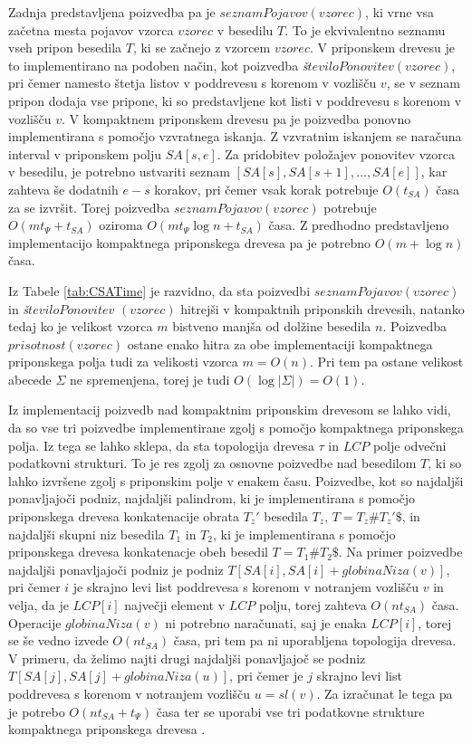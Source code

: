 Zadnja predstavljena poizvedba pa je $seznamPojavov(vzorec)$, ki vrne vsa začetna mesta pojavov vzorca $vzorec$  v besedilu $T$. To je ekvivalentno seznamu vseh pripon besedila $T$, ki se začnejo z vzorcem $vzorec$. V priponskem drevesu je to implementirano na podoben način, kot poizvedba \textit{š}$teviloPonovitev(vzorec)$, pri čemer namesto štetja listov v poddrevesu s korenom v vozlišču $v$, se v seznam pripon dodaja vse pripone, ki so predstavljene kot listi v poddrevesu s korenom v vozlišču $v$. V kompaktnem priponskem drevesu pa je poizvedba ponovno implementirana s pomočjo vzvratnega iskanja. Z vzvratnim iskanjem se naračuna interval v priponskem polju $SA[s,e]$. Za pridobitev položajev ponovitev vzorca v besedilu, je potrebno ustvariti seznam $[SA[s],SA[s+1],\dots,SA[e]]$, kar zahteva še dodatnih $e-s$ korakov, pri čemer vsak korak potrebuje $O(t_{SA})$ časa za se izvršit. Torej poizvedba $seznamPojavov(vzorec)$ potrebuje $O(mt_\Psi+t_{SA})$ oziroma $O(mt_\Psi \log{n}+t_{SA})$ časa. Z predhodno predstavljeno implementacijo kompaktnega priponskega drevesa pa je potrebno $O(m+\log{n})$ časa.

Iz Tabele \ref{tab:CSATime} je razvidno, da sta poizvedbi $seznamPojavov(vzorec)$ in \textit{š}$teviloPonovitev$ $(vzorec)$ hitrejši v kompaktnih priponskih drevesih, natanko tedaj ko je velikost vzorca $m$ bistveno manjša od dolžine besedila $n$. Poizvedba $prisotnost(vzorec)$ ostane enako hitra za obe implementaciji kompaktnega priponskega polja tudi za velikosti vzorca $m=O(n)$. Pri tem pa ostane velikost abecede $\Sigma$ ne spremenjena, torej je tudi $O(\log|\Sigma|)=O(1)$.

Iz implementacij poizvedb nad kompaktnim priponskim drevesom se lahko vidi, da so vse tri poizvedbe implementirane zgolj s pomočjo kompaktnega priponskega polja. Iz tega se lahko sklepa, da sta topologija drevesa $\tau$ in $LCP$ polje odvečni podatkovni strukturi. To je res zgolj za osnovne poizvedbe nad besedilom $T$, ki so lahko izvršene zgolj s priponskim polje v enakem času. Poizvedbe, kot so najdaljši ponavljajoči podniz, najdaljši palindrom, ki je implementirana s pomočjo priponskega drevesa konkatenacije obrata $T_z'$ besedila $T_z$, $T=T_{z}\#T_{z}'\$$, in najdaljši skupni niz besedila $T_1$ in $T_2$, ki je implementirana s pomočjo priponskega drevesa konkatenacje obeh besedil $T=T_1 \# T_2\$ $. Na primer poizvedbe najdaljši ponavljajoči podniz je podniz $T[SA[i],SA[i]+globinaNiza(v)]$, pri čemer $i$ je skrajno levi list poddrevesa s korenom v notranjem vozlišču $v$ in velja, da je $LCP[i]$ največji element v $LCP$ polju, torej zahteva $O(nt_{SA})$ časa. Operacije $globinaNiza(v)$ ni potrebno naračunati, saj je enaka $LCP[i]$, torej se še vedno izvede $O(nt_{SA})$ časa, pri tem pa ni uporabljena topologija drevesa. V primeru, da želimo najti drugi najdaljši ponavljajoč se podniz $T[SA[j],SA[j]+globinaNiza(u)]$, pri čemer je $j$ skrajno levi list poddrevesa s korenom v notranjem vozlišču $u=sl(v)$. Za izračunat le tega pa je potrebo $O(nt_{SA}+t_\Psi)$ časa ter se uporabi vse tri podatkovne strukture kompaktnega priponskega drevesa \cite{Valimaki2007, Weiner1973, Navarro2016}.

